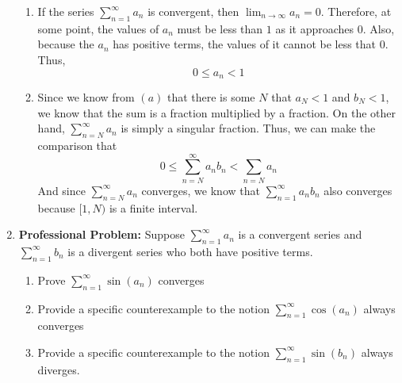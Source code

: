 \documentclass{article}
\begin{document}
\begin{enumerate}[label=\textbf{(11.\arabic*)}]
\begin{enumerate}
    \item If the series $\displaystyle \sum_{n=1}^\infty a_n$ is convergent, then $\displaystyle \lim_{n\to\infty} a_n=0$. Therefore, at some point, the values of $a_n$ must be less than $1$ as it approaches 0. Also, because the $a_n$ has positive terms, the values of it cannot be less that 0.\\
    Thus,
    \[0\le a_n<1\]
    \item Since we know from $(a)$ that there is some $N$ that $a_N<1$ and $b_N<1$, we know that the sum is a fraction multiplied by a fraction. On the other hand, $\displaystyle \sum_{n=N}^\infty a_n$ is simply a singular fraction. Thus, we can make the comparison that
    \[0\le \sum_{n=N}^\infty a_n b_n < \sum_{n=N} a_n\]
    And since $\displaystyle \sum_{n=N}^\infty a_n$ converges, we know that $\displaystyle \sum_{n=1}^\infty a_nb_n$ also converges because $[1,N)$ is a finite interval.
\end{enumerate}

\newpage

\item \textbf{Professional Problem:} Suppose $\displaystyle \sum_{n=1}^\infty a_n$ is a convergent series and $\displaystyle \sum_{n=1}^\infty b_n$ is a divergent series who both have positive terms.
\begin{enumerate}
    \item Prove $\sum_{n=1}^\infty \sin(a_n)$ converges
    \item Provide a specific counterexample to the notion $\sum_{n=1}^\infty \cos(a_n)$ always converges
    \item Provide a specific counterexample to the notion $\sum_{n=1}^\infty \sin(b_n)$ always diverges.
\end{enumerate}


\end{enumerate}
\end{document}
